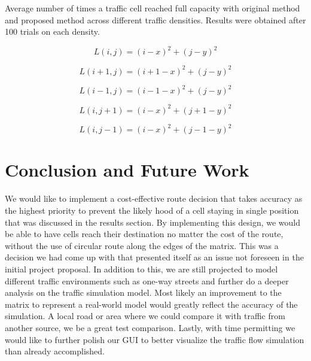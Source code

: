\documentclass[sigplan,screen]{acmart}
\begin{document}
\begin{table}
    \centering
    
    \caption{Average number of times a traffic cell reached full capacity with original method and proposed method across different traffic densities. Results were obtained after 100 trials on each density.}
    \label{tab:full_cells}
\end{table}

\newpage

\begin{equation}
    L(i, j) = (i - x)^2 + (j - y)^2
\end{equation}

\begin{equation}
    L(i + 1, j) = (i + 1 - x)^2 + (j - y)^2
\end{equation}

\begin{equation}
    L(i - 1, j) = (i - 1 - x)^2 + (j - y)^2
\end{equation}

\begin{equation}
    L(i, j + 1) = (i - x)^2 + (j + 1 - y)^2
\end{equation}

\begin{equation}
    L(i, j - 1) = (i - x)^2 + (j - 1 - y)^2
\end{equation}

\section{Conclusion and Future Work}
We would like to implement a cost-effective route decision that takes accuracy
as the highest priority to prevent the likely hood of a cell staying in single
position that was discussed in the results section. By implementing this design,
we would be able to have cells reach their destination no matter the cost of the
route, without the use of circular route along the edges of the matrix. This was
a decision we had come up with that presented itself as an issue not foreseen in
the initial project proposal. In addition to this, we are still projected to
model different traffic environments such as one-way streets and further do a
deeper analysis on the traffic simulation model. Most likely an improvement to
the matrix to represent a real-world model would greatly reflect the accuracy of
the simulation. A local road or area where we could compare it with traffic from
another source, we be a great test comparison. Lastly, with time permitting we
would like to further polish our GUI to better visualize the traffic flow
simulation than already accomplished.



\end{document}
